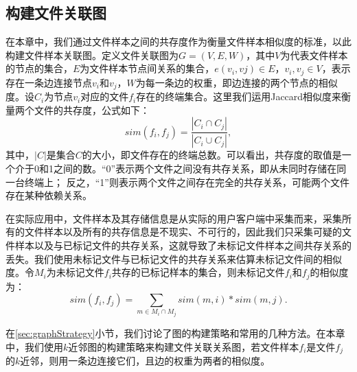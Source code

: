\subsection{构建文件关联图}
\label{sec:fileGraph}
在本章中，我们通过文件样本之间的共存度作为衡量文件样本相似度的标准，以此构建文件样本关联图。定义文件关联图为$G=(V,E,W)$，其中$V$为代表文件样本的节点的集合，$E$为文件样本节点间关系的集合，$e(v_{i},v{j})\in E$，$v_{i}, v_{j}\in V$，表示存在一条边连接节点$v_{i}$和$v_{j}$，$W$为每一条边的权重，即边连接的两个节点的相似度。设$C_{i}$为节点$v_{i}$对应的文件$f_{i}$存在的终端集合。这里我们运用Jaccard相似度来衡量两个文件的共存度，公式如下：
\begin{equation}
sim(f_{i},f_{j})=\frac{\left | C_{i}\cap C_{j} \right |}{\left | C_{i}\cup C_{j} \right |},
\end{equation}
其中，$\left | C \right |$是集合$C$的大小，即文件存在的终端总数。可以看出，共存度的取值是一个介于0和1之间的数。``0''表示两个文件之间没有共存关系，即从未同时存储在同一台终端上； 反之，``1''则表示两个文件之间存在完全的共存关系，可能两个文件存在某种依赖关系。

在实际应用中，文件样本及其存储信息是从实际的用户客户端中采集而来，采集所有的文件样本以及所有的共存信息是不现实、不可行的，因此我们只采集可疑的文件样本以及与已标记文件的共存关系，这就导致了未标记文件样本之间共存关系的丢失。我们使用未标记文件与已标记文件的共存关系来估算未标记文件间的相似度。令$M_{i}$为未标记文件$f_{i}$共存的已标记样本的集合，则未标记文件$f_{i}$和$f_{j}$的相似度为：
\begin{equation}
sim(f_{i},f_{j})=\sum_{m\in M_{i}\cap M_{j}}sim(m,i)*sim(m,j).
\end{equation}

在\ref{sec:graphStrategy}小节，我们讨论了图的构建策略和常用的几种方法。在本章中，我们使用$k$近邻图的构建策略来构建文件关联关系图，若文件样本$f_{i}$是文件$f_{j}$的$k$近邻，则用一条边连接它们，且边的权重为两者的相似度。

